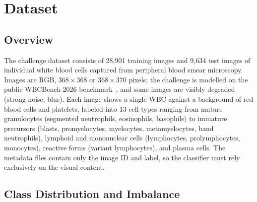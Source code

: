 \documentclass[twocolumn,a4paper]{article}
\begin{document}
\section{Dataset}

\subsection{Overview}

The challenge dataset consists of 28,901 training images and 9,634 test images of individual white blood cells captured from peripheral blood smear microscopy. Images are RGB, $368\times368$ or $368\times370$ pixels; the challenge is modelled on the public WBCBench 2026 benchmark~\cite{wbcbench2026}, and some images are visibly degraded (strong noise, blur). Each image shows a single WBC against a background of red blood cells and platelets, labeled into 13 cell types ranging from mature granulocytes (segmented neutrophils, eosinophils, basophils) to immature precursors (blasts, promyelocytes, myelocytes, metamyelocytes, band neutrophils), lymphoid and mononuclear cells (lymphocytes, prolymphocytes, monocytes), reactive forms (variant lymphocytes), and plasma cells. The metadata files contain only the image ID and label, so the classifier must rely exclusively on the visual content.

\subsection{Class Distribution and Imbalance}
\end{document}
